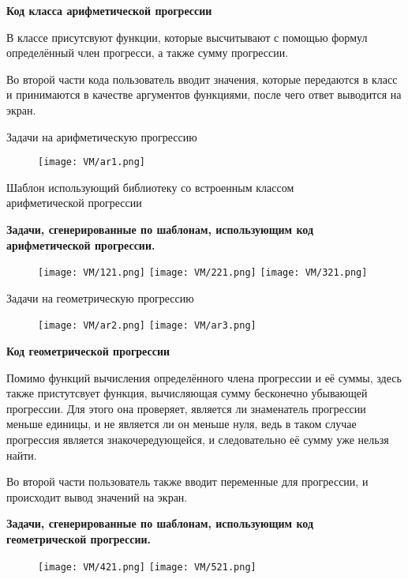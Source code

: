 \textbf{Код класса арифметической прогрессии}



В классе присутсвуют функции, которые высчитывают с помощью формул определённый член прогресси, а также сумму прогрессии. 

Во второй части кода пользователь вводит значения, которые передаются в класс и принимаются в качестве аргументов функциями, после чего ответ выводится на экран.

Задачи на арифметическую прогрессию

\begin{figure}[h]
	\centering
	\texttt{[image: VM/ar1.png]}
	\end{figure}
	
Шаблон использующий библиотеку со встроенным классом
\\ арифметической прогрессии



\textbf{Задачи, сгенерированные по шаблонам, использующим код
\\арифметической прогрессии.}
	\begin{figure}[h]
		\centering
		\texttt{[image: VM/121.png]}
		\texttt{[image: VM/221.png]}
		\texttt{[image: VM/321.png]}
	\end{figure}


Задачи на геометрическую прогрессию

\begin{figure}[h]
	\centering
	\texttt{[image: VM/ar2.png]}
	\texttt{[image: VM/ar3.png]}
	\end{figure}

\textbf{Код геометрической прогрессии}



Помимо функций вычисления определённого члена прогрессии и её суммы, здесь также пристутсвует функция, вычисляющая сумму бесконечно убывающей прогрессии. Для этого она проверяет, является ли знаменатель прогрессии меньше единицы, и не является ли он меньше нуля, ведь в таком случае прогрессия является знакочередующейся, и следовательно её сумму уже нельзя найти.

 Во второй части пользователь также вводит переменные для прогрессии, и происходит вывод значений на экран.

\textbf{Задачи, сгенерированные по шаблонам, использующим код 
\\геометрической прогрессии.}

	\begin{figure}[h]
		\centering
		\texttt{[image: VM/421.png]}
		\texttt{[image: VM/521.png]}
	\end{figure}
	
